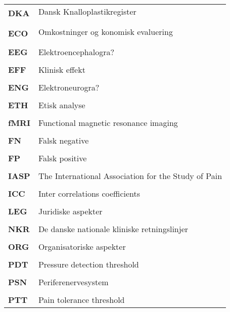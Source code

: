 \begin{longtable}{p{}  p{}}
\textbf{DKA} & Dansk Knalloplastikregister                             
\\ \\
\textbf{ECO} & Omkostninger og konomisk evaluering                     
\\ \\
\textbf{EEG} & Elektroencephalogra?                                     
\\ \\
\textbf{EFF} & Klinisk effekt                                           
\\ \\
\textbf{ENG} & Elektroneurogra?                                         
\\ \\
\textbf{ETH} & Etisk analyse                                            
\\ \\
\textbf{fMRI}& Functional magnetic resonance imaging                    
\\ \\
\textbf{FN}  & Falsk negative                                           
\\ \\
\textbf{FP}  & Falsk positive                                           
\\ \\
\textbf{IASP}& The International Association for the Study of Pain      
\\ \\
\textbf{ICC} & Inter correlations coefficients                          
\\ \\
\textbf{LEG} & Juridiske aspekter                                       
\\ \\
\textbf{NKR} & De danske nationale kliniske retningslinjer              
\\ \\
\textbf{ORG} & Organisatoriske aspekter                                 
\\ \\
\textbf{PDT} & Pressure detection threshold                             
\\ \\
\textbf{PSN} & Periferenervesystem                                      
\\ \\
\textbf{PTT} & Pain tolerance threshold                                 

\end{longtable}
